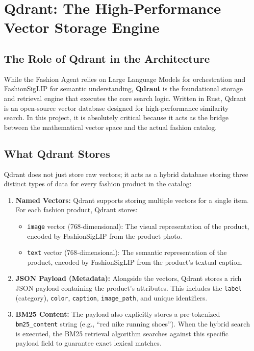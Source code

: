 \section{Qdrant: The High-Performance Vector Storage Engine}

\subsection{The Role of Qdrant in the Architecture}
While the Fashion Agent relies on Large Language Models for orchestration and FashionSigLIP for semantic understanding, \textbf{Qdrant} is the foundational storage and retrieval engine that executes the core search logic. Written in Rust, Qdrant is an open-source vector database designed for high-performance similarity search. In this project, it is absolutely critical because it acts as the bridge between the mathematical vector space and the actual fashion catalog.

\subsection{What Qdrant Stores}
Qdrant does not just store raw vectors; it acts as a hybrid database storing three distinct types of data for every fashion product in the catalog:

\begin{enumerate}
    \item \textbf{Named Vectors:} Qdrant supports storing multiple vectors for a single item. For each fashion product, Qdrant stores:
    \begin{itemize}
        \item \texttt{image} vector (768-dimensional): The visual representation of the product, encoded by FashionSigLIP from the product photo.
        \item \texttt{text} vector (768-dimensional): The semantic representation of the product, encoded by FashionSigLIP from the product's textual caption.
    \end{itemize}
    \item \textbf{JSON Payload (Metadata):} Alongside the vectors, Qdrant stores a rich JSON payload containing the product's attributes. This includes the \texttt{label} (category), \texttt{color}, \texttt{caption}, \texttt{image\_path}, and unique identifiers.
    \item \textbf{BM25 Content:} The payload also explicitly stores a pre-tokenized \texttt{bm25\_content} string (e.g., ``red nike running shoes''). When the hybrid search is executed, the BM25 retrieval algorithm searches against this specific payload field to guarantee exact lexical matches.
\end{enumerate}

